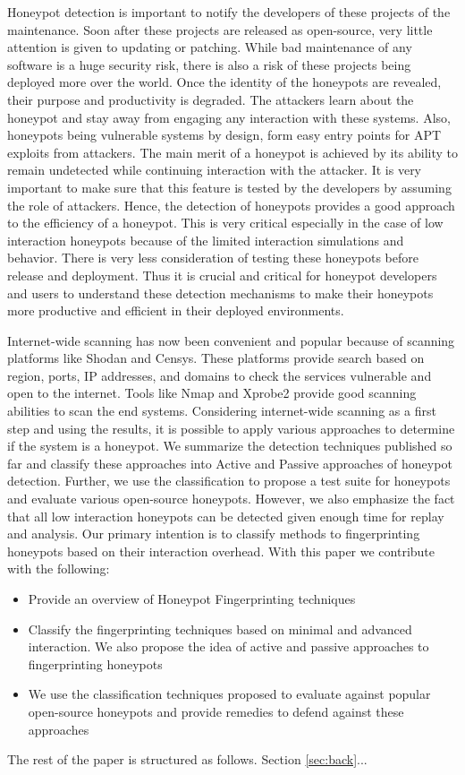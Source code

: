 Honeypot detection is important to notify the developers of these projects of the maintenance. Soon after these projects are released as open-source, very little attention is given to updating or patching. While bad maintenance of any software is a huge security risk, there is also a risk of these projects being deployed more over the world. Once the identity of the honeypots are revealed, their purpose and productivity is degraded. The attackers learn about the honeypot and stay away from engaging any interaction with these systems. Also, honeypots being vulnerable systems by design, form easy entry points for APT exploits from attackers. The main merit of a honeypot is achieved by its ability to remain undetected while continuing interaction with the attacker. It is very important to make sure that this feature is tested by the developers by assuming the role of attackers. Hence, the detection of honeypots provides a good approach to the efficiency of a honeypot. This is very critical especially in the case of low interaction honeypots because of the limited interaction simulations and behavior. There is very less consideration of testing these honeypots before release and deployment. Thus it is crucial and critical for honeypot developers and users to understand these detection mechanisms to make their honeypots more productive and efficient in their deployed environments. 


Internet-wide scanning has now been convenient and popular because of scanning platforms like Shodan and Censys. These platforms provide search based on region, ports, IP addresses, and domains to check the services vulnerable and open to the internet. Tools like Nmap \cite{NMap} and Xprobe2 provide good scanning abilities to scan the end systems. Considering internet-wide scanning as a first step and using the results, it is possible to apply various approaches to determine if the system is a honeypot. We summarize the detection techniques published so far and classify these approaches into Active and Passive approaches of honeypot detection. Further, we use the classification to propose a test suite for honeypots and evaluate various open-source honeypots. However, we also emphasize the fact that all low interaction honeypots can be detected given enough time for replay and analysis. Our primary intention is to classify methods to fingerprinting honeypots based on their interaction overhead. With this paper we contribute with the following:

 \begin{itemize}
    \item Provide an overview of Honeypot Fingerprinting techniques
    \item Classify the fingerprinting techniques based on minimal and advanced interaction. We also propose the idea of active and passive approaches to fingerprinting honeypots
    \item We use the classification techniques proposed to evaluate against popular open-source honeypots and provide remedies to defend against these approaches
 \end{itemize}

The rest of the paper is structured as follows. Section \ref{sec:back}...